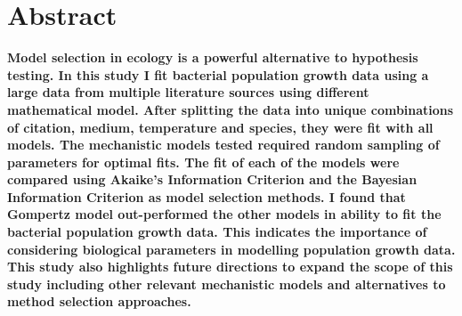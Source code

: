 \documentclass[11pt]{article}
\begin{document}
    \section{Abstract}
	\textbf{Model selection in ecology is a powerful alternative to hypothesis testing. In this study I fit bacterial population growth data using a large data from multiple literature sources using different mathematical model. After splitting the data into unique combinations of citation, medium, temperature and species, they were fit with all models. The mechanistic models tested required random sampling of parameters for optimal fits. The fit of each of the models were compared using Akaike's Information Criterion and the Bayesian Information Criterion as model selection methods. I found that Gompertz model out-performed the other models in ability to fit the bacterial population growth data. This indicates the importance of considering biological parameters in modelling population growth data. This study also highlights future directions to expand the scope of this study including other relevant mechanistic models and alternatives to method selection approaches.}
	
\end{document}

